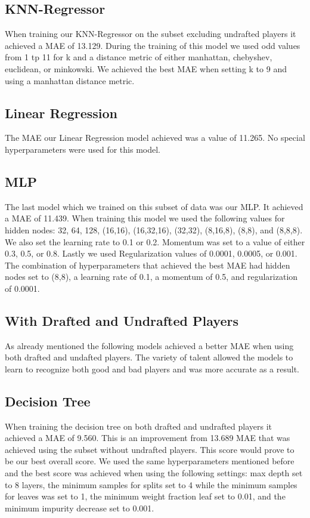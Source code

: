 \documentclass{article}
\begin{document}
\subsection{KNN-Regressor}

When training our KNN-Regressor on the subset excluding undrafted players it
achieved a MAE of 13.129. During the training of this model we used odd values
from 1 tp 11 for k and a distance metric of either manhattan, chebyshev,
euclidean, or minkowski. We achieved the best MAE when setting k to 9 and using
a manhattan distance metric.

\subsection{Linear Regression}

The MAE our Linear Regression model achieved was a value of 11.265. No special
hyperparameters were used for this model.

\subsection{MLP}

The last model which we trained on this subset of data was our MLP. It achieved
a MAE of 11.439. When training this model we used the following values for
hidden nodes: 32, 64, 128, (16,16), (16,32,16), (32,32), (8,16,8), (8,8), and
(8,8,8). We also set the learning rate to 0.1 or 0.2. Momentum was set to a
value of either 0.3, 0.5, or 0.8. Lastly we used Regularization values of
0.0001, 0.0005, or 0.001. The combination of hyperparameters that achieved the
best MAE had hidden nodes set to (8,8), a learning rate of 0.1, a momentum of
0.5, and regularization of 0.0001.

\subsection{With Drafted and Undrafted Players}

As already mentioned the following models achieved a better MAE when using both
drafted and undafted players. The variety of talent allowed the models to learn
to recognize both good and bad players and was more accurate as a result.

\subsection{Decision Tree}

When training the decision tree on both drafted and undrafted players it
achieved a MAE of 9.560. This is an improvement from 13.689 MAE that was
achieved using the subset without undrafted players. This score would prove to
be our best overall score. We used the same hyperparameters mentioned before and
the best score was achieved when using the following settings: max depth set to
8 layers, the minimum samples for splits set to 4 while the minimum samples for
leaves was set to 1, the minimum weight fraction leaf set to 0.01, and the
minimum impurity decrease set to 0.001.
\end{document}

